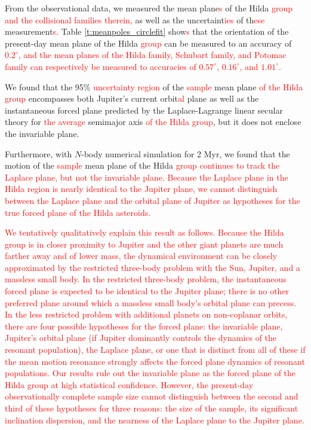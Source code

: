 \documentclass[a4paper,fleqn]{cas-sc}
\begin{document}
\begin{linenumbers}
From the observational data, we measured the mean plane\textcolor{red}{s} of the Hilda \textcolor{red}{group and the collisional families therein,} as well as the uncertaint\textcolor{red}{ies} of th\textcolor{red}{ese} measurement\textcolor{red}{s}. 
Table \ref{t:meanpoles_circlefit} show\textcolor{red}{s} that the orientation of the present-day mean plane of the Hilda \textcolor{red}{group} can be measured to an accuracy of \textcolor{red}{$0.2^\circ$, and the mean planes of the Hilda family, Schubart family, and Potomac family can respectively be measured to accuracies of $0.57^\circ$, $0.16^\circ$, and $1.01^\circ$.}


We found that the 95\% \textcolor{red}{uncertainty region} of the \textcolor{red}{sample} mean plane \textcolor{red}{of the Hilda group} encompasses both Jupiter's current orbit\textcolor{red}{al} plane as well as the instantaneous forced plane predicted by the Laplace-Lagrange linear secular theory for \textcolor{red}{the average} semimajor axis \textcolor{red}{of the Hilda group},
but it does not enclose the invariable plane.

Furthermore, with $N$-body numerical simulation for 2 Myr, we found that the motion of the \textcolor{red}{sample} mean plane of the Hilda \textcolor{red}{group} 
\textcolor{red}{
continues to track the Laplace plane, but not the invariable plane.
Because the Laplace plane in the Hilda region is nearly identical to the Jupiter plane, we cannot distinguish between the Laplace plane and the orbital plane of Jupiter as hypotheses for the true forced plane of the Hilda asteroids. 
}


\textcolor{red}{
We tentatively qualitatively explain this result as follows.
}
\textcolor{red}{
Because the Hilda group is in closer proximity to Jupiter and the other giant planets are much farther away and of lower mass, the dynamical environment can be closely approximated by the restricted three-body problem with the Sun, Jupiter, and a \textcolor{red}{massless small body}.
In the restricted three-body problem, the instantaneous forced plane is expected to be identical to the Jupiter plane; there is no other preferred plane around which a massless small body's orbital plane can precess.
In the less restricted problem with additional planets on non-coplanar orbits, there are four possible hypotheses for the forced plane: the invariable plane, Jupiter's orbital plane (if Jupiter dominantly controls the dynamics of the resonant population), the Laplace plane, or one that is distinct from all of these if the mean motion resonance strongly affects the forced plane dynamics of resonant populations.
Our results rule out the invariable plane as the forced plane of the Hilda group at high statistical confidence.
However, the present-day observationally complete sample size cannot distinguish between the second and third of these hypotheses for three reasons: the size of the sample, its significant inclination dispersion, and the nearness of the Laplace plane to the Jupiter plane.
}


\end{linenumbers}
\end{document}
